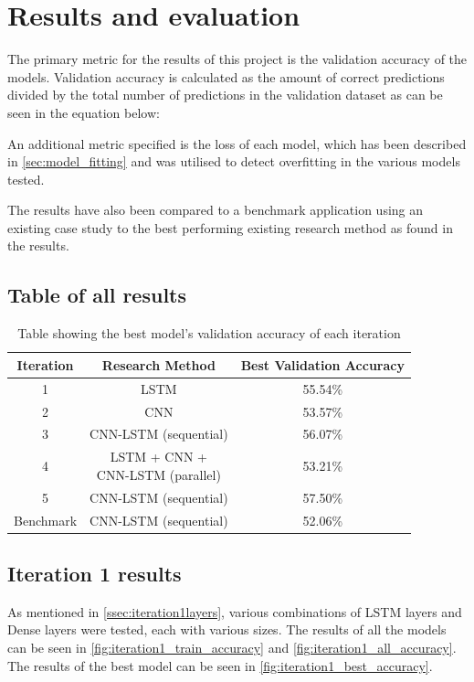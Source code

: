 \chapter{Results and evaluation} \label{chap:results}
The primary metric for the results of this project is the validation accuracy of the models. Validation accuracy is calculated as
the amount of correct predictions divided by the total number of predictions in the validation dataset as can be seen in the equation below:

An additional metric specified is the loss of each model, which has been described in \autoref{sec:model_fitting} and was
utilised to detect overfitting in the various models tested.

The results have also been compared to a benchmark application using an existing case study to the 
best performing existing research method as found in the results. 

\section{Table of all results}
\begin{table}[ht]
    \centering
    \begin{tabular}{|c|c|c|}
        \hline
        Iteration & Research Method & Best Validation Accuracy \\
        \hline\hline
        1 & LSTM & 55.54\%\\
        2 & CNN & 53.57\%\\
        3 & CNN-LSTM (sequential) & 56.07\%\\
        4 & \makecell{LSTM + CNN +\\ CNN-LSTM (parallel)} & 53.21\%\\
        5 & CNN-LSTM (sequential) & 57.50\%\\
        Benchmark & CNN-LSTM (sequential) & 52.06\%\\
        \hline
    \end{tabular}
    \caption{Table showing the best model's validation accuracy of each iteration}
    \label{tab:all_results_overview}
\end{table}

\section{Iteration 1 results}
As mentioned in \autoref{ssec:iteration1layers}, various combinations of LSTM layers and Dense layers were tested,
each with various sizes. The results of all the models can be seen in \autoref{fig:iteration1_train_accuracy}
and \autoref{fig:iteration1_all_accuracy}.\\
The results of the best model can be seen in \autoref{fig:iteration1_best_accuracy}.


